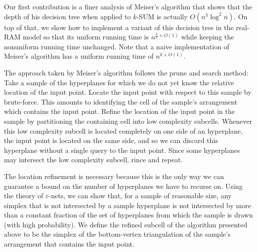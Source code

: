 Our first contribution is a finer analysis of Meiser's algorithm
that shows that the depth of his decision tree when applied to \(k\)-SUM is
actually \(O(n^3 \log^2 n)\).  On top of that, we show how to implement a
variant of this decision tree in the real-RAM model so that its uniform running
time is \(n^{\frac{k}{2} + O(1)}\) while keeping the nonuniform running time
unchanged. Note that a naive implementation of Meiser's algorithm has a uniform
running time of \(n^{k + O(1)}\).

The approach taken by Meiser's algorithm follows the prune and search method:
Take a sample of the hyperplanes for which we do not yet know the relative
location of the input point. Locate the input point with respect to this sample
by brute-force. This amounts to identifying the cell of the sample's arrangement
which contains the input point. Refine the location of the input point in the
sample by partitioning the containing cell into low complexity subcells. Whenever
this low complexity subcell is located completely on one side of an hyperplane,
the input point is located on the same side, and so we can discard this
hyperplane without a single query to the input point. Since some hyperplanes
may intersect the low complexity subcell, rince and repeat.

The location refinement is necessary because this is the only way we can
guarantee a bound on the number of hyperplanes we have to recurse on.
Using the theory of \(\varepsilon\)-nets, we can show that, for a sample of
reasonable size, any simplex that is not intersected by a sample hyperplane
is not intersected by more than a constant fraction of the set of
hyperplanes from which the sample is drawn (with high probability). We
define the refined subcell of the algorithm presented above to be the simplex
of the bottom-vertex triangulation of the sample's arrangement that contains
the input point.
